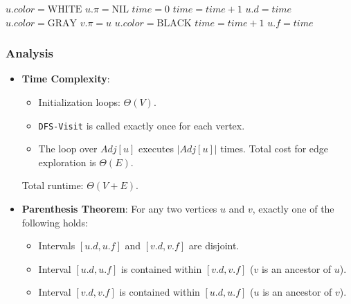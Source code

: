 \documentclass[12pt]{article}
\theoremstyle{blueplain}
\theoremstyle{bluedef}
\theoremstyle{blueremark}
\begin{document}
\begin{algorithm}
    \caption{Depth-First Search}\label{alg:dfs}
    \begin{algorithmic}[1]
        \State $u.color = \text{WHITE}$
        \State $u.\pi = \text{NIL}$
        \EndFor
        \State $time = 0$
        \State {}
        \EndIf
        \EndFor
        \EndProcedure
        \Statex
        \State $time = time + 1$
        \State $u.d = time$
        \State $u.color = \text{GRAY}$
        \State $v.\pi = u$
        \State {}
        \EndIf
        \EndFor
        \State $u.color = \text{BLACK}$
        \State $time = time + 1$
        \State $u.f = time$
        \EndProcedure
    \end{algorithmic}
\end{algorithm}

\subsubsection{Analysis}
\begin{itemize}
    \item \textbf{Time Complexity}:
          \begin{itemize}
              \item Initialization loops: $\Theta(V)$.
              \item \texttt{DFS-Visit} is called exactly once for each vertex.
              \item The loop over $Adj[u]$ executes $|Adj[u]|$ times. Total cost for edge exploration is $\Theta(E)$.
          \end{itemize}
          Total runtime: $\Theta(V + E)$.
    \item \textbf{Parenthesis Theorem}: For any two vertices $u$ and $v$, exactly one of the following holds:
          \begin{itemize}
              \item Intervals $[u.d, u.f]$ and $[v.d, v.f]$ are disjoint.
              \item Interval $[u.d, u.f]$ is contained within $[v.d, v.f]$ ($v$ is an ancestor of $u$).
              \item Interval $[v.d, v.f]$ is contained within $[u.d, u.f]$ ($u$ is an ancestor of $v$).
          \end{itemize}
\end{itemize}
\end{document}
